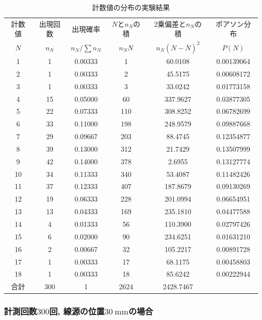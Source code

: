 \documentclass{jarticle}
\begin{document}
\begin{table}[H]
  \centering
  \caption{計数値の分布の実験結果}
  \label{tb:count-distribution-60mm-300times}
  \begin{tabular}{cccccc}
    \hline
    計数値 & 出現回数 & 出現確率 & $N$と$n_N$の積 & 2乗偏差と$n_N$の積 & ポアソン分布 \\
    $N$ & $n_N$ & $n_N/\sum n_N$ & $n_N N$ & $n_N(N-\overline{N})^2$ & $P(N)$ \\
    \hline
    1 & 1 & 0.00333 & 1 & 60.0108 & 0.00139064 \\
    2 & 1 & 0.00333 & 2 & 45.5175 & 0.00608172 \\
    3 & 1 & 0.00333 & 3 & 33.0242 & 0.01773158 \\
    4 & 15 & 0.05000 & 60 & 337.9627 & 0.03877305 \\
    5 & 22 & 0.07333 & 110 & 308.8252 & 0.06782699 \\
    6 & 33 & 0.11000 & 198 & 248.9579 & 0.09887668 \\
    7 & 29 & 0.09667 & 203 & 88.4745 & 0.12354877 \\
    8 & 39 & 0.13000 & 312 & 21.7429 & 0.13507999 \\
    9 & 42 & 0.14000 & 378 & 2.6955 & 0.13127774 \\
    10 & 34 & 0.11333 & 340 & 53.4087 & 0.11482426 \\
    11 & 37 & 0.12333 & 407 & 187.8679 & 0.09130269 \\
    12 & 19 & 0.06333 & 228 & 201.0994 & 0.06654951 \\
    13 & 13 & 0.04333 & 169 & 235.1810 & 0.04477588 \\
    14 & 4 & 0.01333 & 56 & 110.3900 & 0.02797426 \\
    15 & 6 & 0.02000 & 90 & 234.6251 & 0.01631210 \\
    16 & 2 & 0.00667 & 32 & 105.2217 & 0.00891728 \\
    17 & 1 & 0.00333 & 17 & 68.1175 & 0.00458803 \\
    18 & 1 & 0.00333 & 18 & 85.6242 & 0.00222944 \\
    \hline
    合計 & 300 & 1 & 2624 & 2428.7467 & \\
    \hline
  \end{tabular}
\end{table}


\subsubsection{計測回数$300$回, 線源の位置$30\ \mathrm{mm}$の場合}
\end{document}
